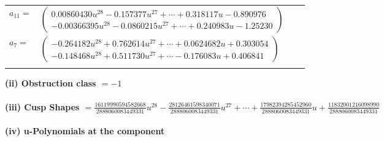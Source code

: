 \documentclass[1p]{elsarticle_modified}
\theoremstyle{definition}
\begin{document}
\begin{tabular}{m{7pt} m{180pt} m{7pt} m{180pt} }
\flushright $a_{11}=$&$\begin{pmatrix}0.00860430 u^{28}-0.157377 u^{27}+\cdots+0.318117 u-0.890976\\-0.00366395 u^{28}-0.0860215 u^{27}+\cdots+0.240983 u-1.25230\end{pmatrix}$ \\
\flushright $a_{7}=$&$\begin{pmatrix}-0.264182 u^{28}+0.762614 u^{27}+\cdots+0.0624682 u+0.303054\\-0.148468 u^{28}+0.511730 u^{27}+\cdots-0.176083 u+0.406841\end{pmatrix}$\\&\end{tabular}
\flushleft \textbf{(ii) Obstruction class $= -1$}\\~\\
\flushleft \textbf{(iii) Cusp Shapes $= \frac{16119990594582668}{2888060083449331} u^{28}-\frac{28126461598340071}{2888060083449331} u^{27}+\cdots+\frac{17982394285452960}{2888060083449331} u+\frac{11832001216098990}{2888060083449331}$}\\~\\
\newpage\renewcommand{\arraystretch}{1}
\flushleft \textbf{(iv) u-Polynomials at the component}\newline \\
\end{document}
